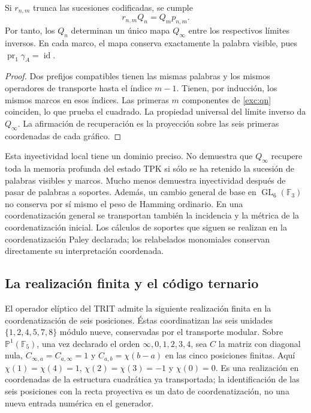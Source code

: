 \begin{proposition}
\label{exc:limite-inverso}
Si $r_{n,m}$ trunca las sucesiones codificadas, se cumple
\[
 r_{n,m}Q_n=Q_m p_{n,m}.
\]
Por tanto, los $Q_n$ determinan un único mapa $Q_\infty$ entre los
respectivos límites inversos. En cada marco, el mapa conserva exactamente
la palabra visible, pues $\operatorname{pr}_1\gamma_A=\operatorname{id}$.
\end{proposition}

\begin{proof}
Dos prefijos compatibles tienen las mismas palabras y los mismos
operadores de transporte hasta el índice $m-1$. Tienen, por inducción,
los mismos marcos en esos índices. Las primeras $m$ componentes de
\eqref{exc:qn} coinciden, lo que prueba el cuadrado. La propiedad
universal del límite inverso da $Q_\infty$. La afirmación de recuperación
es la proyección sobre las seis primeras coordenadas de cada gráfico.
\end{proof}

Esta inyectividad local tiene un dominio preciso. No demuestra que
$Q_\infty$ recupere toda la memoria profunda del estado TPK si sólo se
ha retenido la sucesión de palabras visibles y marcos. Mucho menos
demuestra inyectividad después de pasar de palabras a soportes.
Además, un cambio general de base en $\operatorname{GL}_6(\mathbb F_3)$
no conserva por sí mismo el peso de Hamming ordinario. En una coordenatización
general se transportan también la incidencia y la métrica de la coordenatización
inicial. Los cálculos de soportes que siguen se realizan en la coordenatización
Paley declarada; los relabelados monomiales conservan directamente su
interpretación coordenada.

\subsection{La realización finita y el código ternario}
\label{exc:paley-codigo}

El operador elíptico del TRIT admite la siguiente realización finita en
la coordenatización de seis posiciones. Éstas coordinatizan las seis unidades
$\{1,2,4,5,7,8\}$ módulo nueve, conservadas por el transporte modular.
Sobre $\mathbb P^1(\mathbb F_5)$, una vez
declarado el orden $\infty,0,1,2,3,4$, sea $C$ la matriz con diagonal
nula, $C_{\infty,a}=C_{a,\infty}=1$ y
$C_{a,b}=\chi(b-a)$ en las cinco posiciones finitas. Aquí
$\chi(1)=\chi(4)=1$, $\chi(2)=\chi(3)=-1$ y $\chi(0)=0$.
Es una realización en coordenadas de la estructura cuadrática ya
transportada; la identificación de las seis posiciones con la recta
proyectiva es un dato de coordenatización, no una nueva entrada numérica en el
generador.

